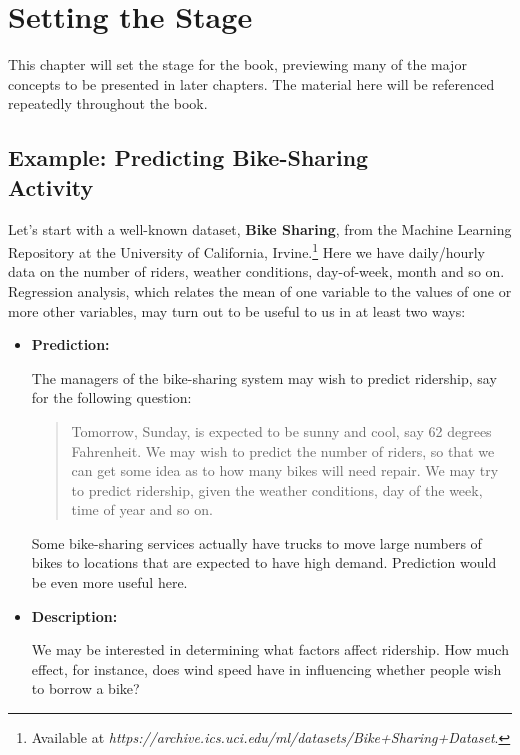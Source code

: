 \chapter{Setting the Stage}  
\label{chap:prologue} 

This chapter will set the stage for the book, previewing many of the
major concepts to be presented in later chapters.  The material here
will be referenced repeatedly throughout the book.

\section{Example:  Predicting Bike-Sharing \\ Activity}
\label{bikeshareintro}

Let's start with a well-known dataset, {\bf Bike Sharing}, from the
Machine Learning Repository at the University of California,
Irvine.\footnote{Available at
\textit{https://archive.ics.uci.edu/ml/datasets/Bike+Sharing+Dataset}.}
Here we have daily/hourly data on the number of riders, weather
conditions, day-of-week, month and so on.  Regression analysis, which
relates the mean of one variable to the values of one or more other
variables, may turn out to be useful to us in at least two ways:

\begin{itemize}

\item {\bf Prediction:}

The managers of the bike-sharing system may wish to predict ridership,
say for the following question: 

\begin{quote}

Tomorrow, Sunday, is expected to be sunny and cool, say 62 degrees
Fahrenheit.  We may wish to predict the number of riders, so that we can
get some idea as to how many bikes will need repair.  We may try to
predict ridership, given the weather conditions, day of the
week, time of year and so on.

\end{quote}

Some bike-sharing services actually have trucks to move large numbers of
bikes to locations that are expected to have high demand.  Prediction
would be even more useful here.

\item {\bf Description:}

We may be interested in determining what factors affect ridership.  How
much effect, for instance, does wind speed have in influencing whether
people wish to borrow a bike?

\end{itemize}


